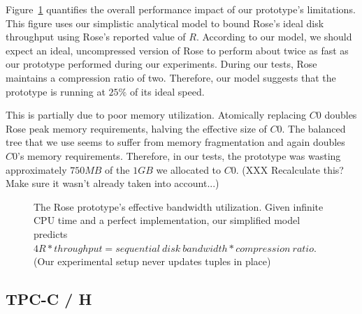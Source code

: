 \documentclass{vldb}
\newcommand{\rows}{Rose\xspace}
\newcommand{\rowss}{Rose's\xspace}
\begin{document}
Figure~\ref{fig:4R} quantifies the overall performance
impact of our prototype's
limitations.  This figure uses our simplistic analytical model
to bound \rowss ideal disk throughput using \rowss
reported value of $R$.  According to our
model, we should expect an ideal, uncompressed version of \rows to
perform about twice as fast as our prototype performed during our experiments.  During our tests, \rows
maintains a compression ratio of two.  Therefore, our model suggests
that the prototype is running at $25\%$ of its ideal speed.


This is partially due to poor memory utilization.  Atomically
replacing $C0$ doubles \rows peak memory requirements, halving the
effective size of $C0$.  The balanced tree that we use seems to suffer
from memory fragmentation and again doubles $C0$'s memory
requirements.  Therefore, in our tests, the prototype was wasting
approximately $750MB$ of the $1GB$ we allocated to $C0$.  (XXX Recalculate this?  Make sure it wasn't already taken into account...)

\begin{figure}
\centering
{}
\caption{The \rows prototype's effective bandwidth utilization.  Given
  infinite CPU time and a perfect implementation, our simplified model predicts $4R * throughput = sequential~disk~bandwidth *
  compression~ratio$.  (Our experimental setup never updates tuples in
  place)}
\label{fig:4R}
\end{figure}

\subsection{TPC-C / H}
\end{document}
